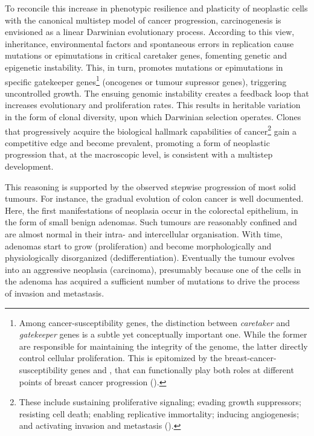 To reconcile this increase in phenotypic resilience and plasticity of neoplastic
cells with the canonical multistep model of cancer
progression,\cite{land_cellular_1983,vogelstein_multistep_1993} carcinogenesis
is envisioned as a linear Darwinian evolutionary
process.\cite{merlo_cancer_2006,polyak_tumor_2014} According to this
view,\cite{podlaha_evolution_2012} inheritance, environmental factors and
spontaneous errors in  replication cause mutations or
epimutations in critical caretaker genes, fomenting genetic and epigenetic
instability.  This, in turn, promotes mutations or epimutations in specific
gatekeeper genes\footnote{Among \mbox{cancer-susceptibility} genes, the
  distinction between \emph{caretaker} and \emph{gatekeeper} genes is a subtle
  yet conceptually important one.  While the former are responsible for
  maintaining the integrity of the genome, the latter directly control cellular
  proliferation.  This is epitomized by the \mbox{breast-cancer-susceptibility}
  genes  and , that can
  functionally play both roles at different points of breast cancer progression
  (\citealp{kinzler_gatekeepers_1997}).}  (oncogenes or tumour supressor genes),
triggering uncontrolled growth.  The ensuing genomic instability creates a
feedback loop that increases evolutionary and proliferation
rates.\cite{sieber_genomic_2003} This results in heritable variation in the form
of clonal diversity, upon which Darwinian selection operates.  Clones that
progressively acquire the biological hallmark capabilities of
cancer\footnote{These include sustaining proliferative signaling; evading growth
  suppressors; resisting cell death; enabling replicative immortality; inducing
  angiogenesis; and activating invasion and metastasis
  (\citealp{hanahan_hallmarks_2011}).} gain a competitive edge and become
prevalent, promoting a form of neoplastic progression that, at the macroscopic
level, is consistent with a multistep development.


This reasoning is supported by the observed \mbox{stepwise} progression of most
solid tumours.  For instance, the gradual evolution of colon cancer is well
documented.\cite{vogelstein_multistep_1993} Here, the first manifestations of
neoplasia occur in the colorectal epithelium, in the form of small benign
adenomas.  Such tumours are reasonably confined and are almost normal in their
intra- and intercellular organisation.  With time, adenomas start to grow
(proliferation) and become morphologically and physiologically disorganized
(dedifferentiation).  Eventually the tumour evolves into an aggressive neoplasia
(carcinoma), presumably because one of the cells in the adenoma has acquired a
sufficient number of mutations to drive the process of invasion and metastasis.

